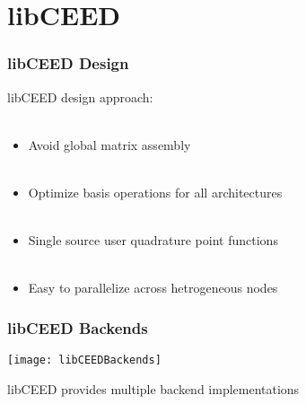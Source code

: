 \documentclass{beamer}
\begin{document}
\section{libCEED}


\begin{frame}
\begin{center}
\frametitle{libCEED Design}

libCEED design approach:\\

~\\

\begin{itemize}

\item Avoid global matrix assembly\\

~\\

\item Optimize basis operations for all architectures\\

~\\

\item Single source user quadrature point functions\\

~\\

\item Easy to parallelize across hetrogeneous nodes

\end{itemize}

\end{center}
\end{frame}


\begin{frame}
\begin{center}
\frametitle{libCEED Backends}

\texttt{[image: libCEEDBackends]}

libCEED provides multiple backend implementations\\

\end{center}
\end{frame}
\end{document}
